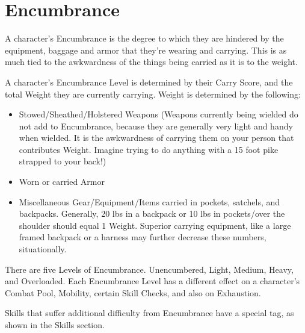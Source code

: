 \documentclass[oneside,11pt,english]{book}
\begin{document}
\section{Encumbrance}\label{sec:Encumbrance}
A character’s Encumbrance is the degree to which they are hindered by the
equipment, baggage and armor that they’re wearing and carrying. This is as much
tied to the awkwardness of the things being carried as it is to the weight.

A character’s Encumbrance Level is determined by their Carry Score, and the
total Weight they are currently carrying. Weight is determined by the following:
\begin{itemize}
\item Stowed/Sheathed/Holstered Weapons (Weapons currently being wielded do not
  add to Encumbrance, because they are generally very light and handy when
  wielded. It is the awkwardness of carrying them on your person that
  contributes Weight. Imagine trying to do anything with a 15 foot pike strapped
  to your back!)
\item Worn or carried Armor
\item Miscellaneous Gear/Equipment/Items carried in pockets, satchels, and
  backpacks. Generally, 20 lbs in a backpack or 10 lbs in pockets/over the
  shoulder should equal 1 Weight. Superior carrying equipment, like a large
  framed backpack or a harness may further decrease these numbers,
  situationally.
\end{itemize}
There are five Levels of Encumbrance. Unencumbered, Light, Medium, Heavy, and
Overloaded. Each Encumbrance Level has a different effect on a character’s
Combat Pool, Mobility, certain Skill Checks, and also on Exhaustion.

Skills that suffer additional difficulty from Encumbrance have a special tag, as
shown in the Skills section.
\end{document}
